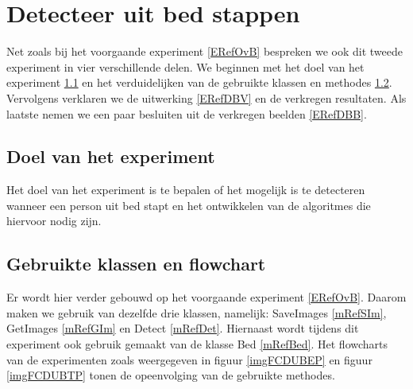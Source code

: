 \section{Detecteer uit bed stappen}
\label{ERefDUB}
Net zoals bij het voorgaande experiment \ref{ERefOvB} bespreken we ook dit tweede experiment in vier verschillende delen. We beginnen met het doel van het experiment \ref{ERefDBD} en het verduidelijken van de gebruikte klassen en methodes \ref{ERefDBK}. Vervolgens verklaren we de uitwerking \ref{ERefDBV} en de verkregen resultaten. Als laatste nemen we een paar besluiten uit de verkregen beelden \ref{ERefDBB}.

\subsection{Doel van het experiment}
\label{ERefDBD}
Het doel van het experiment is te bepalen of het mogelijk is te detecteren wanneer een person uit bed stapt en het ontwikkelen van de algoritmes die hiervoor nodig zijn. 

\subsection{Gebruikte klassen en flowchart}
\label{ERefDBK}
Er wordt hier verder gebouwd op het voorgaande experiment \ref{ERefOvB}. Daarom maken we gebruik van dezelfde drie klassen, namelijk: SaveImages \ref{mRefSIm}, GetImages \ref{mRefGIm} en Detect \ref{mRefDet}. Hiernaast wordt tijdens dit experiment ook gebruik gemaakt van de klasse Bed \ref{mRefBed}. Het flowcharts van de experimenten zoals weergegeven in figuur \ref{imgFCDUBEP} en figuur \ref{imgFCDUBTP} tonen de opeenvolging van de gebruikte methodes.

